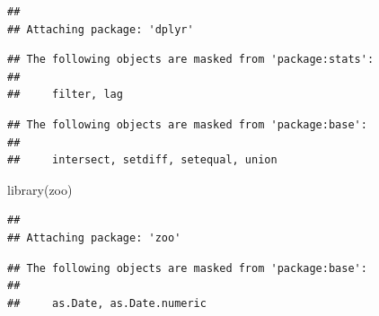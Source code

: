 \documentclass[
]{article}
\newenvironment{Shaded}{\begin{snugshade}}{\end{snugshade}}
\newcommand{\FunctionTok}[1]{\textcolor[rgb]{0.00,0.00,0.00}{#1}}
\newcommand{\NormalTok}[1]{#1}
\begin{document}
\begin{verbatim}
## 
## Attaching package: 'dplyr'
\end{verbatim}

\begin{verbatim}
## The following objects are masked from 'package:stats':
## 
##     filter, lag
\end{verbatim}

\begin{verbatim}
## The following objects are masked from 'package:base':
## 
##     intersect, setdiff, setequal, union
\end{verbatim}

\begin{Shaded}
\begin{Highlighting}[]
\FunctionTok{library}\NormalTok{(zoo) }
\end{Highlighting}
\end{Shaded}

\begin{verbatim}
## 
## Attaching package: 'zoo'
\end{verbatim}

\begin{verbatim}
## The following objects are masked from 'package:base':
## 
##     as.Date, as.Date.numeric
\end{verbatim}
\end{document}
